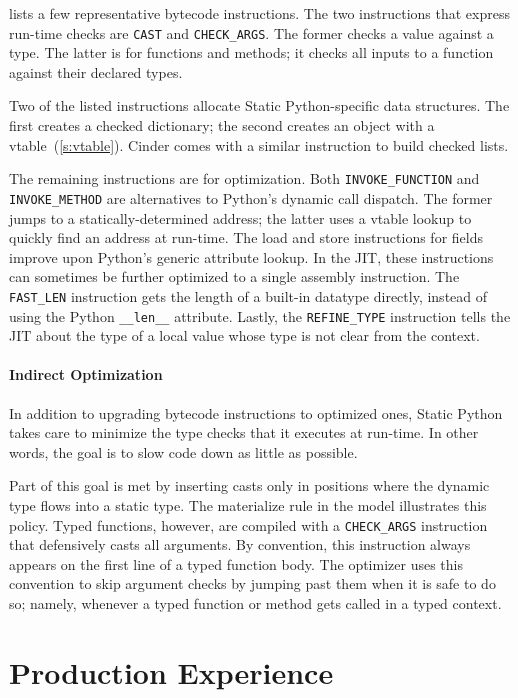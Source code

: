 \documentclass[english,cleveref,submission]{programming}
\newcommand{\SP}{Static Python}
\newcommand{\code}[1]{\texttt{#1}}
\newcommand{\bcinst}[1]{\code{#1}}
\begin{document}
 lists a few representative bytecode instructions.
The two instructions that express run-time checks are \code{CAST}
and \code{CHECK\_ARGS}.
The former checks a value against a type.
The latter is for functions and methods; it checks all inputs to a function
against their declared types.

Two of the listed instructions allocate \SP{}-specific data structures.
The first creates a checked dictionary; the second creates an object with a vtable~(\cref{s:vtable}).
Cinder comes with a similar instruction to build checked lists.

The remaining instructions are for optimization.
Both \bcinst{INVOKE\_FUNCTION} and \bcinst{INVOKE\_METHOD} are alternatives
to Python's dynamic call dispatch.
The former jumps to a statically-determined address;
the latter uses a vtable lookup to quickly find an address at run-time.
The load and store instructions for fields improve upon Python's generic attribute lookup.
In the JIT, these instructions can sometimes be further optimized to a single assembly instruction.
The \bcinst{FAST\_LEN} instruction gets the length of a built-in datatype directly, instead
of using the Python \code{\_\_len\_\_} attribute.
Lastly, the \bcinst{REFINE\_TYPE} instruction tells the JIT about the type of a local value whose
type is not clear from the context.


\paragraph{Indirect Optimization}

In addition to upgrading bytecode instructions to optimized ones, \SP{} takes care
to minimize the type checks that it executes at run-time.
In other words, the goal is to slow code down as little as possible.

Part of this goal is met by inserting casts only in positions where the dynamic
type flows into a static type.
The materialize rule in the model illustrates this policy.
Typed functions, however, are compiled with a \bcinst{CHECK\_ARGS} instruction
that defensively casts all arguments.
By convention, this instruction always appears on the first line of a typed
function body.
The optimizer uses this convention to skip argument checks by jumping past them
when it is safe to do so; namely, whenever a typed function or method gets
called in a typed context.


\section{Production Experience}
\label{s:eval}
\end{document}
